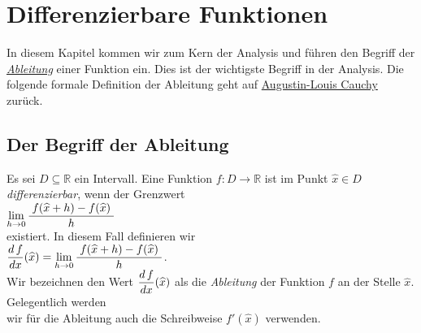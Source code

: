 \chapter{Differenzierbare Funktionen}
In diesem Kapitel kommen wir zum Kern der Analysis und f\"uhren den Begriff der 
\href{http://de.wikipedia.org/wiki/Differentialrechnung}{\emph{Ableitung}} einer Funktion ein. 
Dies ist der wichtigste Begriff in der Analysis.  Die folgende formale Definition der Ableitung geht auf 
\href{http://de.wikipedia.org/wiki/Augustin-Louis_Cauchy}{Augustin-Louis Cauchy} zur\"uck.


\section{Der Begriff der Ableitung}
\begin{Definition}[Ableitung]
Es sei $D \subseteq \mathbb{R}$ ein Intervall.  
Eine Funktion $f: D \rightarrow \mathbb{R}$ ist im Punkt $\widehat{x} \in D$ \emph{differenzierbar},
wenn der Grenzwert
\\[0.3cm]
\hspace*{1.3cm}
$\lim\limits_{h \rightarrow 0} \displaystyle\frac{\;\displaystyle f(\widehat{x} + h) - f(\widehat{x})\;}{\;\displaystyle h\;}$
\\[0.3cm]
existiert.  In diesem Fall definieren wir 
\\[0.3cm]
\hspace*{1.3cm}
$\displaystyle\frac{d\,f}{dx}(\widehat{x}) = \lim\limits_{h \rightarrow 0}
\displaystyle\frac{\;\displaystyle f(\widehat{x} + h) - f(\widehat{x})\;}{\;\displaystyle h\;}$.
\\[0.3cm]
Wir bezeichnen den Wert $\displaystyle\frac{d\,f}{dx}(\widehat{x})$ als die \emph{Ableitung} der
Funktion $f$ an der Stelle $\widehat{x}$.  Gelegentlich werden \\[0.2cm]
wir f\"ur die Ableitung auch die Schreibweise 
$f'(\widehat{x})$ verwenden.
\eod
\end{Definition}


